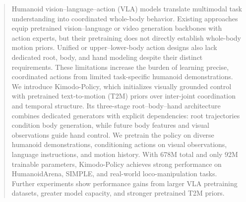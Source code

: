 \begin{abstract}
  Humanoid vision--language--action (VLA) models translate multimodal task understanding into coordinated whole-body behavior. Existing approaches equip pretrained vision--language or video generation backbones with action experts, but their pretraining does not directly establish whole-body motion priors. Unified or upper--lower-body action designs also lack dedicated root, body, and hand modeling despite their distinct requirements. These limitations increase the burden of learning precise, coordinated actions from limited task-specific humanoid demonstrations. We introduce Kimodo-Policy, which initializes visually grounded control with pretrained text-to-motion (T2M) priors over inter-joint coordination and temporal structure. Its three-stage root--body--hand architecture combines dedicated generators with explicit dependencies: root trajectories condition body generation, while future body features and visual observations guide hand control. We pretrain the policy on diverse humanoid demonstrations, conditioning actions on visual observations, language instructions, and motion history. With 678M total and only 92M trainable parameters, Kimodo-Policy achieves strong performance on HumanoidArena, SIMPLE, and real-world loco-manipulation tasks. Further experiments show performance gains from larger VLA pretraining datasets, greater model capacity, and stronger pretrained T2M priors.
\end{abstract}
